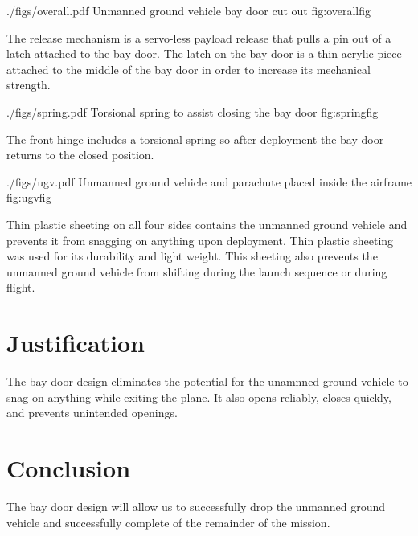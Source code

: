 \documentclass[]{auvsi_doc}
\begin{document}
\AUVSIFigure
{./figs/overall.pdf}
{\textwidth}
{Unmanned ground vehicle bay door cut out}
{fig:overallfig}

The release mechanism is a servo-less payload release that pulls a pin out of a latch attached to the bay door. The latch on the bay door is a thin acrylic piece attached to the middle of the bay door in order to increase its mechanical strength.

\AUVSIFigure
{./figs/spring.pdf}
{\textwidth}
{Torsional spring to assist closing the bay door}
{fig:springfig}

The front hinge includes a torsional spring so after deployment the bay door returns to the closed position.

\AUVSIFigure
{./figs/ugv.pdf}
{\textwidth}
{Unmanned ground vehicle and parachute placed inside the airframe}
{fig:ugvfig}

Thin plastic sheeting on all four sides contains the unmanned ground vehicle and prevents it from snagging on anything upon deployment. Thin plastic sheeting was used for its durability and light weight. This sheeting also prevents the unmanned ground vehicle from shifting during the launch sequence or during flight.

\section{Justification}

The bay door design eliminates the potential for the unamnned ground vehicle to snag on anything while exiting the plane. It also opens reliably, closes quickly, and prevents unintended openings.

\section{Conclusion}

The bay door design will allow us to successfully drop the unmanned ground vehicle and successfully complete of the remainder of the mission.
\end{document}
